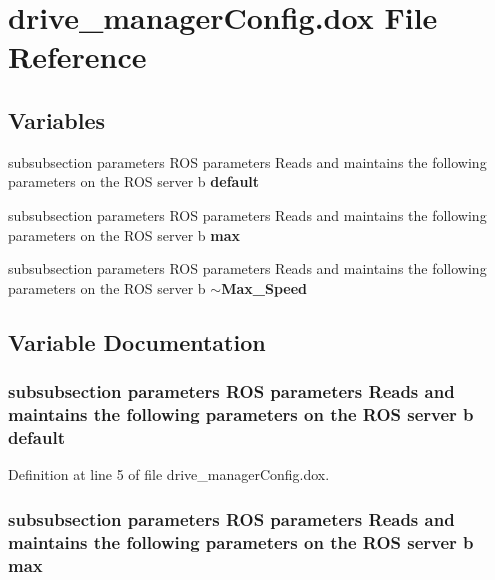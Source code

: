 \section{drive\-\_\-manager\-Config.\-dox \-File \-Reference}
\label{drive__managerConfig_8dox}
\subsection*{\-Variables}
\begin{DoxyCompactItemize}
\item 
subsubsection parameters \-R\-O\-S \*
parameters \-Reads and maintains \*
the following parameters on \*
the \-R\-O\-S server b {\bf default}
\item 
subsubsection parameters \-R\-O\-S \*
parameters \-Reads and maintains \*
the following parameters on \*
the \-R\-O\-S server b {\bf max}
\item 
subsubsection parameters \-R\-O\-S \*
parameters \-Reads and maintains \*
the following parameters on \*
the \-R\-O\-S server b {\bf $\sim$\-Max\-\_\-\-Speed}
\end{DoxyCompactItemize}


\subsection{\-Variable \-Documentation}
\subsubsection[{default}]{\setlength{\rightskip}{0pt plus 5cm}subsubsection parameters \-R\-O\-S parameters \-Reads and maintains the following parameters on the \-R\-O\-S server b {\bf default}}\label{drive__managerConfig_8dox_a94d02332ecf13e7845f06fe8c343e101}


\-Definition at line 5 of file drive\-\_\-manager\-Config.\-dox.

\subsubsection[{max}]{\setlength{\rightskip}{0pt plus 5cm}subsubsection parameters \-R\-O\-S parameters \-Reads and maintains the following parameters on the \-R\-O\-S server b {\bf max}}\label{drive__managerConfig_8dox_a55c9de72d9f3630abdf51bfe39c191dd}


